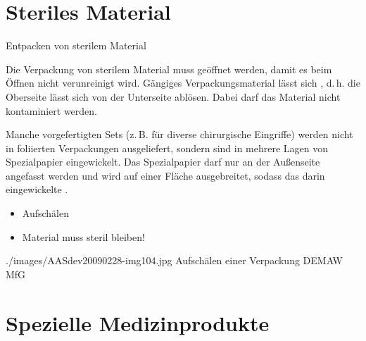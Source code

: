 \section{Steriles Material}


\TextSlidePicture
{Entpacken von sterilem Material}%
{%
Die Verpackung von sterilem Material muss 
geöffnet werden, damit es beim Öffnen nicht verunreinigt
wird. Gängiges Verpackungsmaterial lässt sich
, d.\,h. die Oberseite lässt sich von der
Unterseite ablösen. Dabei darf das Material nicht
kontaminiert werden.

Manche vorgefertigten Sets (z.\,B. für diverse chirurgische
Eingriffe) werden nicht in foliierten Verpackungen
ausgeliefert, sondern sind in mehrere Lagen von Spezialpapier
eingewickelt. Das Spezialpapier darf nur an der Außenseite
angefasst werden und wird auf einer Fläche ausgebreitet,
sodass das darin eingewickelte .}%
{
\begin{itemize}
  \item Aufschälen
  \item Material muss steril bleiben!
\end{itemize}}%
{./images/AASdev20090228-img104.jpg}%
{Aufschälen einer Verpackung}%
{}%
{DEMAW}%
{MfG}%






\section{Spezielle Medizinprodukte}

